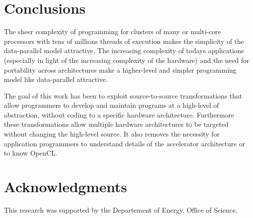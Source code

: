 \documentclass{acm_proc_article-sp}
\begin{document}





%


\section{Conclusions}

The sheer complexity of programming for clusters of many or multi-core
processors with tens of millions threads of execution makes the simplicity of
the data-parallel model attractive.  The increasing complexity of
todays applications (especially in light of the increasing complexity
of the hardware) and the need for portability across architectures
make a higher-level and simpler programming model like data-parallel
attractive.

The goal of this work has been to exploit source-to-source transformations that
allow programmers to develop and maintain programs at a high-level of
abstraction, without coding to a specific hardware architecture.
Furthermore these transformations allow multiple hardware architectures
to be targeted without changing the high-level source.  It also removes the
necessity for application programmers to understand details of the accelerator
architecture or to know OpenCL.

\section{Acknowledgments}
This research was supported by the Departement of Energy, Office of Science.





\balancecolumns
\end{document}
